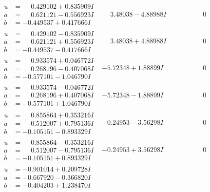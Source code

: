 \documentclass[1p]{elsarticle_modified}
\theoremstyle{definition}
\begin{document}
$$\begin{array}{c|c|c}
\begin{aligned}
u &= \phantom{-}0.429102 + 0.835909 I \\
a &= \phantom{-}0.621121 - 0.556923 I \\
b &= -0.449537 + 0.417666 I\end{aligned}
 & \phantom{-}3.48038 - 4.88988 I & \phantom{-0.000000 } 0 \\ \hline\begin{aligned}
u &= \phantom{-}0.429102 - 0.835909 I \\
a &= \phantom{-}0.621121 + 0.556923 I \\
b &= -0.449537 - 0.417666 I\end{aligned}
 & \phantom{-}3.48038 + 4.88988 I & \phantom{-0.000000 } 0 \\ \hline\begin{aligned}
u &= \phantom{-}0.933574 + 0.046772 I \\
a &= \phantom{-}0.268196 - 0.407068 I \\
b &= -0.577101 - 1.046790 I\end{aligned}
 & -5.72348 + 1.88899 I & \phantom{-0.000000 } 0 \\ \hline\begin{aligned}
u &= \phantom{-}0.933574 - 0.046772 I \\
a &= \phantom{-}0.268196 + 0.407068 I \\
b &= -0.577101 + 1.046790 I\end{aligned}
 & -5.72348 - 1.88899 I & \phantom{-0.000000 } 0 \\ \hline\begin{aligned}
u &= \phantom{-}0.855864 + 0.353216 I \\
a &= \phantom{-}0.512007 + 0.795136 I \\
b &= -0.105151 - 0.893329 I\end{aligned}
 & -0.24953 - 3.56298 I & \phantom{-0.000000 } 0 \\ \hline\begin{aligned}
u &= \phantom{-}0.855864 - 0.353216 I \\
a &= \phantom{-}0.512007 - 0.795136 I \\
b &= -0.105151 + 0.893329 I\end{aligned}
 & -0.24953 + 3.56298 I & \phantom{-0.000000 } 0 \\ \hline\begin{aligned}
u &= -0.901014 + 0.209728 I \\
a &= -0.667920 - 0.366820 I \\
b &= -0.404203 + 1.238470 I\end{aligned}

\end{array}$$
\end{document}
